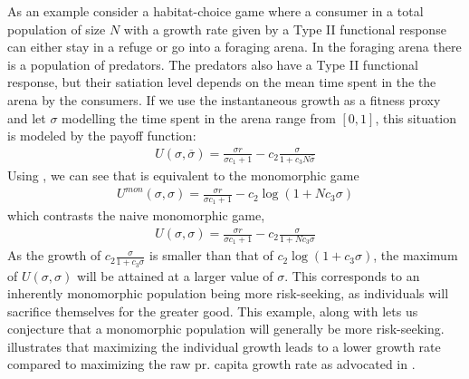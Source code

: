 As an example consider a habitat-choice game where a consumer in a total population of size $N$ with a growth rate given by a Type II functional response can either stay in a refuge or go into a foraging arena. In the foraging arena there is a population of predators. The predators also have a Type II functional response, but their satiation level depends on the mean time spent in the the arena by the consumers. If we use the instantaneous growth as a fitness proxy and let $\sigma$ modelling the time spent in the arena range from $[0,1]$, this situation is modeled by the payoff function:
\begin{align}
  U(\sigma,\overbar{\sigma}) = \frac{\sigma r}{\sigma c_1 + 1} - c_2\frac{\sigma}{1 + c_3 N \overbar{\sigma}}
  \label{eq:simple_mfg}
\end{align}
Using , we can see that  is equivalent to the monomorphic game
\begin{align}
  U^{mon}(\sigma,\sigma) = \frac{\sigma r}{\sigma c_1 + 1} - c_2\log(1+N c_3\sigma)
\end{align}
which contrasts the naive monomorphic game,
\begin{align}
  U(\sigma,\sigma) = \frac{\sigma r}{\sigma c_1 + 1} - c_2\frac{\sigma}{1 + N c_3\sigma}
\end{align}
As the growth of $c_2\frac{\sigma}{1 + c_3\sigma}$ is smaller than that of $c_2\log(1+c_3 \sigma)$, the maximum of $U(\sigma,\sigma)$ will be attained at a larger value of $\sigma$. This corresponds to an inherently monomorphic population being more risk-seeking, as individuals will sacrifice themselves for the greater good. This example, along with  lets us conjecture that a monomorphic population will generally be more risk-seeking.   illustrates that maximizing the individual growth leads to a lower growth rate compared to maximizing the raw pr. capita growth rate as advocated in \citep{vincent2005evolutionary}.


